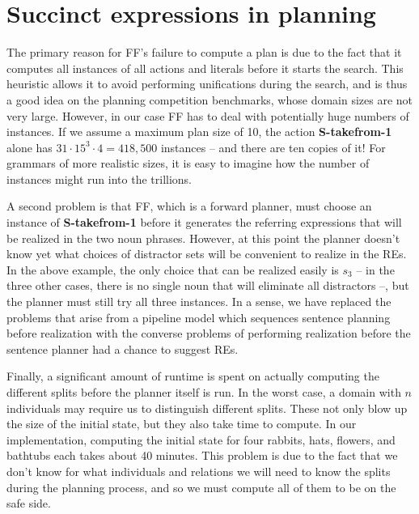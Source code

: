 \section{Succinct expressions in planning}
\label{sec:howto}

The primary reason for FF's failure to compute a plan is due to the
fact that it computes all instances of all actions and literals before
it starts the search.  This heuristic allows it to avoid performing
unifications during the search, and is thus a good idea on the
planning competition benchmarks, whose domain sizes are not very
large.  However, in our case FF has to deal with potentially huge
numbers of instances.  If we assume a maximum plan size of 10, the
action \textbf{S-takefrom-1} alone has $31 \cdot 15^3 \cdot 4 =
418,500$ instances -- and there are ten copies of it!  For grammars of
more realistic sizes, it is easy to imagine how the number of
instances might run into the trillions.

A second problem is that FF, which is a forward planner, must choose
an instance of \textbf{S-takefrom-1} before it generates the referring
expressions that will be realized in the two noun phrases.  However,
at this point the planner doesn't know yet what choices of distractor
sets will be convenient to realize in the REs.  In the above example,
the only choice that can be realized easily is $s_3$ -- in the three
other cases, there is no single noun that will eliminate all
distractors --, but the planner must still try all three
instances.   In a sense, we have replaced the problems that arise
from a pipeline model which sequences sentence planning before
realization with the converse problems of performing realization
before the sentence planner had a chance to suggest REs.

Finally, a significant amount of runtime is spent on actually
computing the different splits before the planner itself is run.  In
the worst case, a domain with $n$ individuals may require us to
distinguish  different splits.  These not only blow up the
size of the initial state, but they also take  time to
compute.  In our implementation, computing the initial state for four
rabbits, hats, flowers, and bathtubs each takes about 40 minutes.
This problem is due to the fact that we don't know for what
individuals and relations we will need to know the splits during the
planning process, and so we must compute all of them to be on the safe
side.


